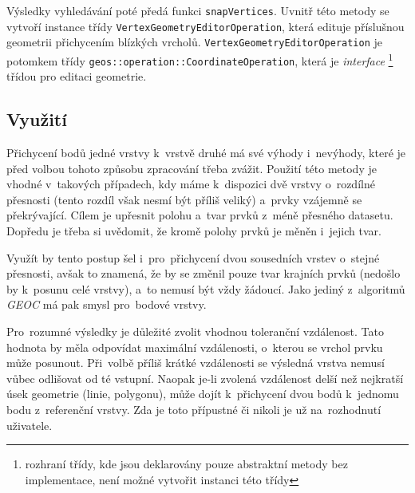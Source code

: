 Výsledky vyhledávání poté předá funkci \texttt{snap\-Vertices}. Uvnitř této
metody se vytvoří instance  třídy \texttt{Vertex\-Geometry\-Editor\-Operation},
která edituje příslušnou geometrii přichycením blízkých vrcholů.
\texttt{Vertex\-Geometry\-Editor\-Operation} je potomkem třídy 
\texttt{geos::\-operation::\-Coordinate\-Operation}, která je \textit{inter\-face}
\footnote{rozhraní třídy, kde jsou deklarovány pouze abstraktní metody bez
implementace, není možné vytvořit instanci této třídy} třídou pro editaci 
geometrie.


\subsection{Využití}
\label{vs-vyuziti}

Přichycení bodů jedné vrstvy k~vrstvě druhé má své výhody i~nevýhody, které 
je před volbou tohoto způsobu zpracování třeba zvážit. Použití této metody 
je vhodné v~takových případech, kdy máme k~dispozici dvě vrstvy o~rozdílné 
přesnosti (tento rozdíl však nesmí být příliš veliký) a~prvky vzájemně se 
překrývající. Cílem je upřesnit polohu a~tvar prvků z~méně přesného datasetu. 
Dopředu je třeba si uvědomit, že kromě polohy prvků je měněn i~jejich tvar.

Využít by tento postup šel i~pro~přichycení dvou sousedních vrstev o~stejné 
přesnosti, avšak to znamená, že by se změnil pouze tvar krajních prvků 
(nedošlo by k~posunu celé vrstvy), a~to nemusí být vždy žádoucí. Jako jediný
z~algoritmů \textit{GEOC} má pak smysl pro~bodové vrstvy.

Pro~rozumné výsledky je důležité zvolit vhodnou toleranční vzdálenost. Tato 
hodnota by měla odpovídat maximální vzdálenosti, o~kterou se vrchol prvku 
může posunout. Při~volbě příliš krátké vzdálenosti se výsledná vrstva nemusí 
vůbec odlišovat od té vstupní. Naopak \mbox{je-li} zvolená vzdálenost delší 
než nejkratší úsek geometrie (linie, polygonu), může dojít k~přichycení dvou 
bodů k~jednomu bodu z~referenční vrstvy. Zda je toto přípustné či nikoli je 
už na~rozhodnutí uživatele.


% 

